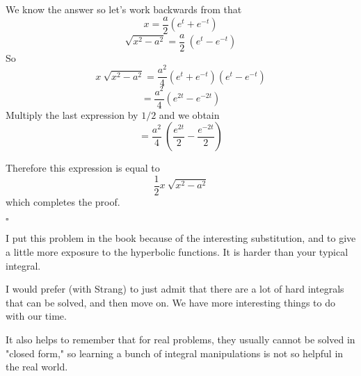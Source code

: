 \documentclass[11pt, oneside]{article}
\begin{document}
We know the answer so let's work backwards from that
\[ x = \frac{a}{2} (e^t + e^{-t}) \]
\[ \sqrt{x^2 - a^2} = \frac{a}{2} \ (e^t - e^{-t}) \]
So
\[ x \ \sqrt{x^2 - a^2} = \frac{a^2}{4} (e^t + e^{-t}) (e^t - e^{-t})  \]
\[ = \frac{a^2}{4} (e^{2t}  - e^{-2t}) \]
Multiply the last expression by $1/2$ and we obtain
\[ = \frac{a^2}{4} \ (\frac{e^{2t}}{2} - \frac{e^{-2t}}{2} )  \]

Therefore this expression is equal to
\[ \frac{1}{2} x \ \sqrt{x^2-a^2} \]
which completes the proof.

$\square$

I put this problem in the book because of the interesting substitution, and to give a little more exposure to the hyperbolic functions.  It is harder than your typical integral.  

I would prefer (with Strang) to just admit that there are a lot of hard integrals that can be solved, and then move on.  We have more interesting things to do with our time.  

It also helps to remember that for real problems, they usually cannot be solved in "closed form," so learning a bunch of integral manipulations is not so helpful in the real world.
\end{document}
